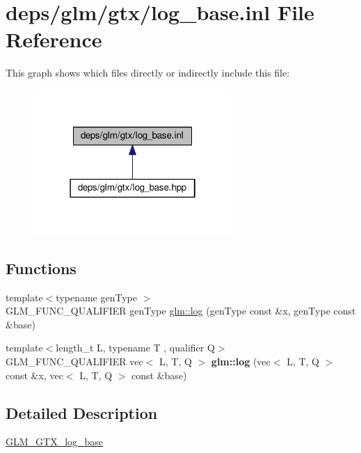 \hypertarget{log__base_8inl}{}\section{deps/glm/gtx/log\+\_\+base.inl File Reference}
\label{log__base_8inl}
This graph shows which files directly or indirectly include this file\+:
\nopagebreak
\begin{figure}[H]
\begin{center}
\leavevmode
\includegraphics[width=214pt]{d5/da4/log__base_8inl__dep__incl}
\end{center}
\end{figure}
\subsection*{Functions}
\begin{DoxyCompactItemize}
\item 
{\footnotesize template$<$typename gen\+Type $>$ }\\G\+L\+M\+\_\+\+F\+U\+N\+C\+\_\+\+Q\+U\+A\+L\+I\+F\+I\+ER gen\+Type \hyperlink{group__gtx__log__base_ga60a7b0a401da660869946b2b77c710c9}{glm\+::log} (gen\+Type const \&x, gen\+Type const \&base)
\item 
\mbox{\label{log__base_8inl_a2b3dd2e2389685ab1a11a30ca5f0ba2d}} 
{\footnotesize template$<$length\+\_\+t L, typename T , qualifier Q$>$ }\\G\+L\+M\+\_\+\+F\+U\+N\+C\+\_\+\+Q\+U\+A\+L\+I\+F\+I\+ER vec$<$ L, T, Q $>$ {\bfseries glm\+::log} (vec$<$ L, T, Q $>$ const \&x, vec$<$ L, T, Q $>$ const \&base)
\end{DoxyCompactItemize}


\subsection{Detailed Description}
\hyperlink{group__gtx__log__base}{G\+L\+M\+\_\+\+G\+T\+X\+\_\+log\+\_\+base} 